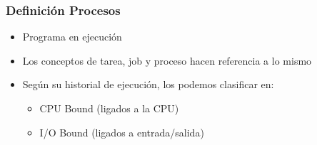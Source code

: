 \begin{frame}
  \frametitle{Definición Procesos}
  \begin{itemize}
	  \item Programa en ejecución
	  \item Los conceptos de tarea, job y proceso hacen referencia a lo mismo
	  \item Según su historial de ejecución, los podemos clasificar en:
	  \begin{itemize}
	  	\item CPU Bound (ligados a la CPU)
	  	\item I/O Bound (ligados a entrada/salida)
	  \end{itemize}
  \end{itemize}
\end{frame}

